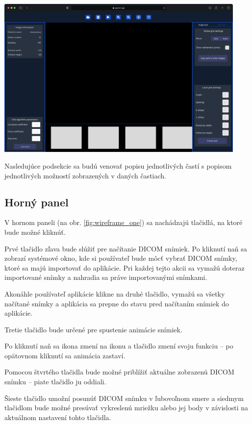 \begin {center}
\centering
\includegraphics[height=8cm]{media/wireframes/2.png}
\captionsetup{justification=centering}
\label{fig:wireframe_two}
\end {center}

Nasledujúce podsekcie sa budú venovať popisu jednotlivých častí s popisom jednotlivých možností zobrazených v daných častiach.

\subsection {Horný panel}
V hornom paneli (na obr. \ref{fig:wireframe_one}) sa nachádzajú tlačidlá, na ktoré bude možné kliknúť.

Prvé tlačidlo zľava bude slúžiť pre načítanie DICOM snímiek. Po kliknutí naň sa zobrazí systémové okno, kde si používateľ bude môcť vybrať DICOM snímky, ktoré sa majú importovať do aplikácie. Pri každej tejto akcii sa vymažú doteraz importované snímky a nahradia sa práve importovanými snímkami.

Akonáhle používateľ aplikácie klikne na druhé tlačidlo, vymažú sa všetky načítané snímky a aplikácia sa prepne do stavu pred načítaním snímiek do aplikácie.

Tretie tlačidlo bude určené pre spustenie animácie snímiek.

Po kliknutí naň sa ikona zmení na  ikonu a tlačidlo zmení svoju funkciu -- po opätovnom kliknutí sa animácia zastaví.

Pomocou štvrtého tlačidla bude možné priblížiť aktuálne zobrazenú DICOM snímku -- piate tlačidlo ju oddiali.

Šieste tlačidlo umožní posunúť DICOM snímku v ľubovoľnom smere a siedmym tlačidlom bude možné presúvať vykreslenú mriežku alebo jej body v závislosti na aktuálnom nastavení tohto tlačidla.

